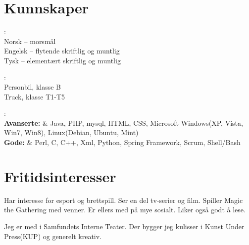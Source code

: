 \documentclass[letterpaper]{article}
\renewenvironment{itemize}{
  \begin{list}{}{
    \setlength{\leftmargin}{1.5em}
  }
}{
  \end{list}
}
\begin{document}
\section*{Kunnskaper}
\begin{itemize}
	\item[Språk]:\\
	Norsk – morsmål \\
	Engelsk – flytende skriftlig og muntlig \\
	Tysk – elementært skriftlig og muntlig

	\item[Førerkort]:\\
	Personbil, klasse B\\
	Truck, klasse T1-T5

	\item[IT]:\\
	{\bf Avanserte:} & Java, PHP, mysql, HTML, CSS, Microsoft Windows(XP, Vista, Win7, Win8), Linux(Debian,
Ubuntu, Mint)\\
	{\bf Gode:} & Perl, C, C++, Xml, Python, Spring Framework, Scrum, Shell/Bash
\end{itemize}

\section*{Fritidsinteresser}
\begin{itemize}
	\item Har interesse for esport og brettspill. Ser en del tv-serier og film.
Spiller Magic the Gathering med venner. Er ellers med på mye sosialt. Liker
også godt å lese. 
	\item Jeg er med i Samfundets Interne Teater. Der bygger jeg kulisser i
Kunst Under Press(KUP) og generelt kreativ.
\end{itemize}
\end{document}
